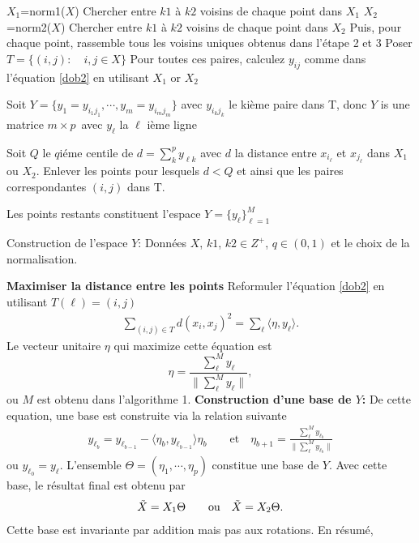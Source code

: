 \begin{algorithm}
\SetAlgoLined
$X_1$=norm1($X$)\;
Chercher entre $k1$ à $k2$ voisins de chaque point dans $X_1$\;
$X_2$=norm2($X$)\;
Chercher entre $k1$ à $k2$ voisins de chaque point dans $X_2$\;
Puis, pour chaque point, rassemble tous les voisins uniques obtenus dans l'étape 2 et 3\;
Poser $T=\{(i,j): \quad i,j\in X\}$\;
Pour toutes ces paires, calculez $y_{ij}$ comme dans l'équation \eqref{dob2} en utilisant $X_1$ or $X_2$\;

Soit $Y=\{y_1=y_{i_1j_1},\cdots,y_m=y_{i_mj_m}\}$
avec $y_{i_kj_k}$ le kième paire dans T, donc $Y$ is une matrice $m \times p$\ avec $y_\ell$ la $\ell$ ième ligne\;

Soit $Q$ le $q$iéme centile de $d=\sum_k^p y_{\ell k}$ avec $d$ la distance entre $x_{i_\ell}$ et $
x_{j_\ell}$ dans $X_1$ ou $X_2$.\;
Enlever les points pour lesquels $d<Q$ et ainsi que les paires correspondantes $(i,j)$ dans T.\;

Les points restants constituent l'espace $Y=\{y_\ell \}^M_{\ell=1}$\;
\caption{Construction de l'espace $Y$: Données $X$, $k1$, $k2 \in Z^+$, $q\in (0, 1)$ et le choix de la normalisation.}
\end{algorithm}%
\textbf{Maximiser la distance entre les points}
Reformuler l'équation \eqref{dob2} en utilisant $T(\ell)=(i,j)$
\begin{align}\label{dob3}
\sum_{(i,j)\in T}d(x_i,x_j)^2=\sum_\ell \langle\eta,y_\ell\rangle.
\end{align}
Le vecteur unitaire $\eta$ qui maximize cette équation est $$\displaystyle \eta=\frac{\sum_\ell^M y_\ell}{\|\sum_\ell^M y_\ell\|},$$ ou $M$ est obtenu dans l'algorithme 1.\newl
\textbf{Construction d'une base de $Y$: }
De cette equation, une base est construite via la relation suivante
\begin{align*}
y_{\ell_b}=y_{\ell_{b-1}}- \langle\eta_b,y_{\ell_{b-1}}\rangle \eta_b\qquad\text{et}\quad
\eta_{b+1}=\frac{\sum_\ell^M y_{\ell_b}}{\|\sum_\ell^M y_{\ell_b}\|}
\end{align*}
ou $y_{\ell_0}=y_\ell$. L'ensemble $\Theta=(\eta_1,\cdots,\eta_p)$ constitue une base de $Y$.  Avec cette base, le résultat final est obtenu par 
\begin{align}\label{newx}
\Tilde{X}=X_1\Theta \qquad\text{ou}\quad \tilde{X}=X_2\Theta.
\end{align}
Cette base est invariante par addition mais pas aux rotations. En résumé, 
